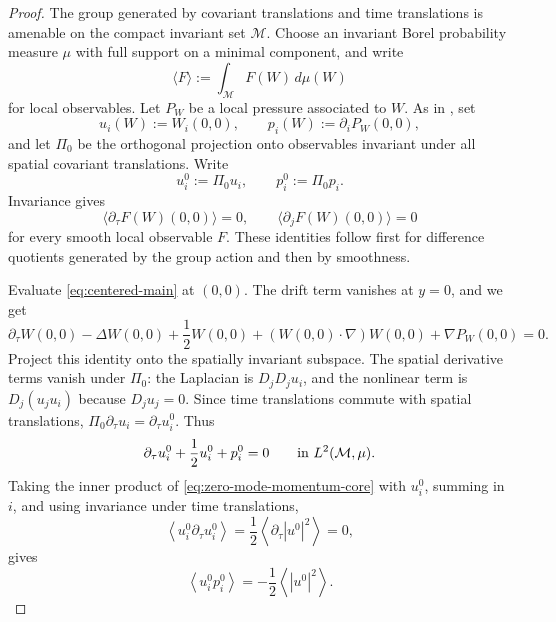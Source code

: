 \documentclass[11pt]{amsart}
\numberwithin{equation}{section}
\theoremstyle{plain}
\theoremstyle{definition}
\theoremstyle{remark}
\newcommand{\calM}{\mathcal M}
\begin{document}
\begin{proof}
The group generated by covariant translations and time translations is
amenable on the compact invariant set \(\calM\).  Choose an invariant Borel
probability measure \(\mu\) with full support on a minimal component, and write
\[
   \langle F\rangle:=\int_{\calM}F(W)\,d\mu(W)
\]
for local observables.  Let \(P_W\) be a local pressure associated to \(W\).
As in , set
\[
   u_i(W):=W_i(0,0),
   \qquad
   p_i(W):=\partial_iP_W(0,0),
\]
and let \(\Pi_0\) be the orthogonal projection onto observables invariant under
all spatial covariant translations.  Write
\[
   u_i^0:=\Pi_0u_i,
   \qquad
   p_i^0:=\Pi_0p_i .
\]
Invariance gives
\[
   \langle \partial_\tau F(W)(0,0)\rangle=0,
   \qquad
   \langle \partial_j F(W)(0,0)\rangle=0
\]
for every smooth local observable \(F\).  These identities follow first for
difference quotients generated by the group action and then by smoothness.

Evaluate \eqref{eq:centered-main} at \((0,0)\).  The drift term vanishes at
\(y=0\), and we get
\[
   \partial_\tau W(0,0)-\Delta W(0,0)+\frac12 W(0,0)
   +(W(0,0)\cdot\nabla)W(0,0)+\nabla P_W(0,0)=0 .
\]
Project this identity onto the spatially invariant subspace.  The spatial
derivative terms vanish under \(\Pi_0\): the Laplacian is
\(D_jD_j u_i\), and the nonlinear term is \(D_j(u_ju_i)\) because
\(D_ju_j=0\).  Since time translations commute with spatial translations,
\(\Pi_0\partial_\tau u_i=\partial_\tau u_i^0\).  Thus
\begin{equation}\label{eq:zero-mode-momentum-core}
   \partial_\tau u_i^0+\frac12u_i^0+p_i^0=0
   \qquad\hbox{in }L^2(\calM,\mu).
\end{equation}
Taking the inner product of \eqref{eq:zero-mode-momentum-core} with \(u_i^0\),
summing in \(i\), and using invariance under time translations,
\[
   \left\langle u_i^0\partial_\tau u_i^0\right\rangle
   =
   \frac12\left\langle\partial_\tau |u^0|^2\right\rangle
   =0,
\]
gives
\begin{equation}\label{eq:zero-mode-pressure-work-core}
   \left\langle u_i^0p_i^0\right\rangle
   =
   -\frac12\left\langle|u^0|^2\right\rangle .
\end{equation}


\end{proof}
\end{document}
